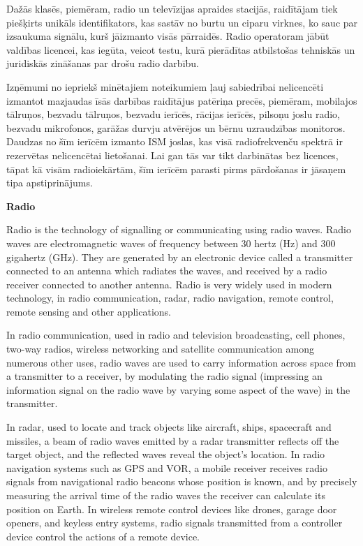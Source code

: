 \documentclass[a4paper, twoside, 12pt]{book}
\begin{document}
Dažās klasēs, piemēram, radio un televīzijas apraides stacijās, raidītājam tiek piešķirts unikāls identifikators, kas sastāv no burtu un ciparu virknes, ko sauc par izsaukuma signālu, kurš jāizmanto visās pārraidēs. Radio operatoram jābūt valdības licencei, kas iegūta, veicot testu, kurā pierādītas atbilstošas tehniskās un juridiskās zināšanas par drošu radio darbību.

Izņēmumi no iepriekš minētajiem noteikumiem ļauj sabiedrībai nelicencēti izmantot mazjaudas īsās darbības raidītājus patēriņa precēs, piemēram, mobilajos tālruņos, bezvadu tālruņos, bezvadu ierīcēs, rācijas ierīcēs, pilsoņu joslu radio, bezvadu mikrofonos, garāžas durvju atvērējos un bērnu uzraudzības monitoros. Daudzas no šīm ierīcēm izmanto ISM joslas, kas visā radiofrekvenču spektrā ir rezervētas nelicencētai lietošanai. Lai gan tās var tikt darbinātas bez licences, tāpat kā visām radioiekārtām, šīm ierīcēm parasti pirms pārdošanas ir jāsaņem tipa apstiprinājums.

\vfill{}
\pagebreak

{\noindent \textbf{Radio}}
\vspace{6pt}

Radio is the technology of signalling or communicating using radio waves. Radio waves are electromagnetic waves of frequency between 30 hertz (Hz) and 300 gigahertz (GHz). They are generated by an electronic device called a transmitter connected to an antenna which radiates the waves, and received by a radio receiver connected to another antenna. Radio is very widely used in modern technology, in radio communication, radar, radio navigation, remote control, remote sensing and other applications.

In radio communication, used in radio and television broadcasting, cell phones, two-way radios, wireless networking and satellite communication among numerous other uses, radio waves are used to carry information across space from a transmitter to a receiver, by modulating the radio signal (impressing an information signal on the radio wave by varying some aspect of the wave) in the transmitter.

In radar, used to locate and track objects like aircraft, ships, spacecraft and missiles, a beam of radio waves emitted by a radar transmitter reflects off the target object, and the reflected waves reveal the object's location.
In radio navigation systems such as GPS and VOR, a mobile receiver receives radio signals from navigational radio beacons whose position is known, and by precisely measuring the arrival time of the radio waves the receiver can calculate its position on Earth. In wireless remote control devices like drones, garage door openers, and keyless entry systems, radio signals transmitted from a controller device control the actions of a remote device.
\end{document}
